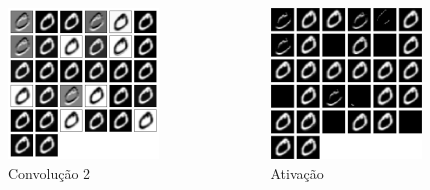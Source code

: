 \documentclass[tikz,10pt]{beamer}
\begin{document}
\begin{frame}
\begin{columns}
		\begin{column}{0.33\textwidth}
			\begin{figure}
				\includegraphics[height=4cm]{images/resultados/network_1/input_1_layer_convolution2d_2}%
				\caption{Convolução 2}
			\end{figure}%
		\end{column}
		\begin{column}{0.33\textwidth}
			\begin{figure}
				\includegraphics[height=4cm]{images/resultados/network_1/input_1_layer_activation_2}%
				\caption{Ativação}			
			\end{figure}%
		\end{column}	
	\end{columns}
	
\end{frame}
\end{document}
